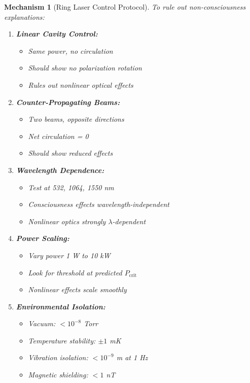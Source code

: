 \documentclass[11pt]{article}
\newtheorem{mechanism}[theorem]{Mechanism}
\theoremstyle{definition}
\begin{document}
\begin{mechanism}[Ring Laser Control Protocol]
To rule out non-consciousness explanations:

\begin{enumerate}
\item \textbf{Linear Cavity Control:}
   \begin{itemize}
   \item Same power, no circulation
   \item Should show no polarization rotation
   \item Rules out nonlinear optical effects
   \end{itemize}

\item \textbf{Counter-Propagating Beams:}
   \begin{itemize}
   \item Two beams, opposite directions
   \item Net circulation = 0
   \item Should show reduced effects
   \end{itemize}

\item \textbf{Wavelength Dependence:}
   \begin{itemize}
   \item Test at 532, 1064, 1550 nm
   \item Consciousness effects wavelength-independent
   \item Nonlinear optics strongly $\lambda$-dependent
   \end{itemize}

\item \textbf{Power Scaling:}
   \begin{itemize}
   \item Vary power 1 W to 10 kW
   \item Look for threshold at predicted $P_{\text{crit}}$
   \item Nonlinear effects scale smoothly
   \end{itemize}

\item \textbf{Environmental Isolation:}
   \begin{itemize}
   \item Vacuum: $< 10^{-8}$ Torr
   \item Temperature stability: $\pm 1$ mK
   \item Vibration isolation: $< 10^{-9}$ m at 1 Hz
   \item Magnetic shielding: $< 1$ nT
   \end{itemize}
\end{enumerate}
\end{mechanism}
\end{document}
